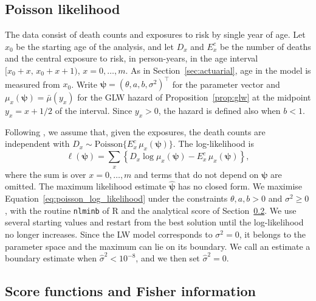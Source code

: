 \documentclass[12pt]{article}
\begin{document}
\subsection{Poisson likelihood}

The data consist of death counts and exposures to risk by single year of age. Let $x_0$ be the starting age of the analysis, and let $D_x$ and $E^c_x$ be the number of deaths and the central exposure to risk, in person-years, in the age interval $[x_0+x,\,x_0+x+1)$, $x=0,\ldots,m$. As in Section~\ref{sec:actuarial}, age in the model is measured from $x_0$. Write $\bm{\psi} = (\theta, a, b, \sigma^2)^\top$ for the parameter vector and $\mu_x(\bm{\psi})=\bar{\mu}(y_x)$ for the GLW hazard of Proposition~\ref{prop:glw} at the midpoint $y_x=x+1/2$ of the interval. Since $y_x>0$, the hazard is defined also when $b<1$.

Following \citet{brillinger1986biometrics}, we assume that, given the exposures, the death counts are independent with $D_x\sim\text{Poisson}\{E^c_x\,\mu_x(\bm{\psi})\}$. The log-likelihood is
\begin{equation} \label{eq:poisson_log_likelihood}
\ell(\bm{\psi}) = \sum_{x} \left\{ D_x \log \mu_x(\bm{\psi}) - E^c_x\, \mu_x(\bm{\psi}) \right\},
\end{equation}
where the sum is over $x=0,\ldots,m$ and terms that do not depend on $\bm{\psi}$ are omitted. The maximum likelihood estimate $\hat{\bm{\psi}}$ has no closed form. We maximise Equation~\eqref{eq:poisson_log_likelihood} under the constraints $\theta,a,b>0$ and $\sigma^2\geq0$, with the routine {\tt nlminb} of {\sf R} \citep{R2024} and the analytical score of Section~\ref{sec:score}. We use several starting values and restart from the best solution until the log-likelihood no longer increases. Since the LW model corresponds to $\sigma^2=0$, it belongs to the parameter space and the maximum can lie on its boundary. We call an estimate a boundary estimate when $\hat\sigma^2<10^{-8}$, and we then set $\hat\sigma^2=0$.

\subsection{Score functions and Fisher information}\label{sec:score}
\end{document}
